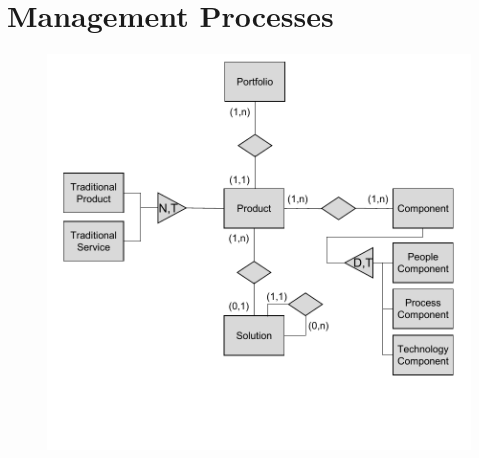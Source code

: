 

	

	


	
	
	 
	
	
	
	
\section{Management Processes}

\begin{figure}[caption={Solution-Product-Portfolio structure }, label={fig:prodstructure}]
	{	\includegraphics[width=.8\textwidth]{figures/producterm.pdf}}
	
\end{figure} 



